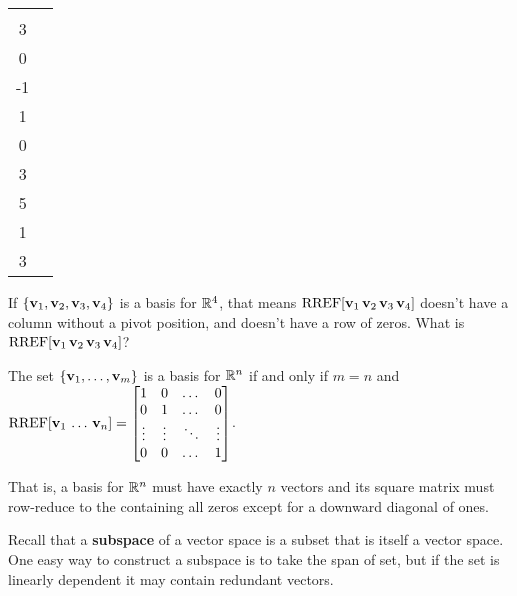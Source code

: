 \begin{applicationActivities}
\begin{activity}{15}
\begin{tabular}{cc}
   \(\left\{
    \begin{bmatrix}5\\3\\0\\-1\end{bmatrix},
    \begin{bmatrix}-2\\1\\0\\3\end{bmatrix},
    \begin{bmatrix}4\\5\\1\\3\end{bmatrix}
    \right\}
    \)  &
  \end{tabular}
\end{activity}

\begin{activity}{10}
  If \(\{\mathbf v_1,\mathbf v_2,\mathbf v_3,\mathbf v_4\}\) is a basis for
  \(\mathbb{R}^4\), that means \(\operatorname{RREF}[\mathbf v_1\,\mathbf v_2\,\mathbf v_3\,\mathbf v_4]\)
  doesn't have a column without a pivot position, and doesn't have a
  row of zeros. What is \(\operatorname{RREF}[\mathbf v_1\,\mathbf v_2\,\mathbf v_3\,\mathbf v_4]\)?
\end{activity}

\begin{fact}
  The set \(\{\mathbf v_1,\dots,\mathbf v_m\}\) is a basis for \(\mathbb{R}^n\) if and
  only if \(m=n\) and
  \(\operatorname{RREF}[\mathbf v_1\,\dots\,\mathbf v_n]=
  \begin{bmatrix}
    1&0&\dots&0\\
    0&1&\dots&0\\
    \vdots&\vdots&\ddots&\vdots\\
    0&0&\dots&1
  \end{bmatrix}
  \).

  That is, a basis for \(\mathbb{R}^n\) must have exactly \(n\) vectors and
  its square matrix must row-reduce to the 
  containing all zeros except for a downward diagonal of ones.
\end{fact}

\begin{observation}
Recall that a \textbf{subspace} of a vector space is a subset that is itself a vector space.
\vspace{1em}
One easy way to construct a subspace is to take the span of set, but if the set is linearly 
dependent it may contain redundant vectors.
\end{observation}


\end{applicationActivities}
